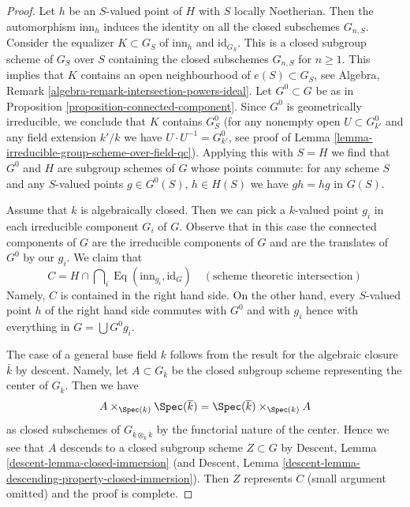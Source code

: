 \begin{proof}
\medskip\noindent
Let $h$ be an $S$-valued point of $H$ with $S$ locally Noetherian.
Then the automorphism $\text{inn}_h$ induces the identity on all
the closed subschemes $G_{n, S}$. Consider the equalizer
$K \subset G_S$ of $\text{inn}_h$ and $\text{id}_{G_S}$.
This is a closed subgroup scheme of $G_S$ over $S$ containing the
closed subschemes $G_{n, S}$ for $n \geq 1$.
This implies that $K$ contains an open neighbourhood of
$e(S) \subset G_S$, see
Algebra, Remark \ref{algebra-remark-intersection-powers-ideal}.
Let $G^0 \subset G$ be as in Proposition \ref{proposition-connected-component}.
Since $G^0$ is geometrically irreducible, we conclude that $K$ contains
$G^0_S$ (for any nonempty open $U \subset G^0_{k'}$ and any field extension
$k'/k$ we have $U \cdot U^{-1} = G^0_{k'}$, see proof of
Lemma \ref{lemma-irreducible-group-scheme-over-field-qc}).
Applying this with $S = H$ we find that $G^0$ and $H$
are subgroup schemes of $G$ whose points commute: for any scheme $S$
and any $S$-valued points $g \in G^0(S)$, $h \in H(S)$ we have
$gh = hg$ in $G(S)$.

\medskip\noindent
Assume that $k$ is algebraically closed. Then we can pick a $k$-valued
point $g_i$ in each irreducible component $G_i$ of $G$. Observe that in
this case the connected components of $G$ are the irreducible components
of $G$ and are the translates of $G^0$ by our $g_i$. We claim that
$$
C = H \cap \bigcap\nolimits_i \operatorname{Eq}(\text{inn}_{g_i}, \text{id}_G)
\quad (\text{scheme theoretic intersection})
$$
Namely, $C$ is contained in the right hand side. On the other hand, every
$S$-valued point $h$ of the right hand side commutes with $G^0$
and with $g_i$ hence with everything in $G = \bigcup G^0g_i$.

\medskip\noindent
The case of a general base field $k$ follows from the result for the
algebraic closure $\overline{k}$ by descent. Namely, let
$A \subset G_{\overline{k}}$ be the closed subgroup scheme representing
the center of $G_{\overline{k}}$. Then we have
$$
A \times_{\Spec(k)} \Spec(\overline{k}) =
\Spec(\overline{k}) \times_{\Spec(k)} A
$$
as closed subschemes of $G_{\overline{k} \otimes_k \overline{k}}$ by
the functorial nature of the center. Hence we see that $A$ descends
to a closed subgroup scheme $Z \subset G$ by
Descent, Lemma \ref{descent-lemma-closed-immersion}
(and Descent, Lemma \ref{descent-lemma-descending-property-closed-immersion}).
Then $Z$ represents $C$ (small argument omitted) and the proof is complete.
\end{proof}







